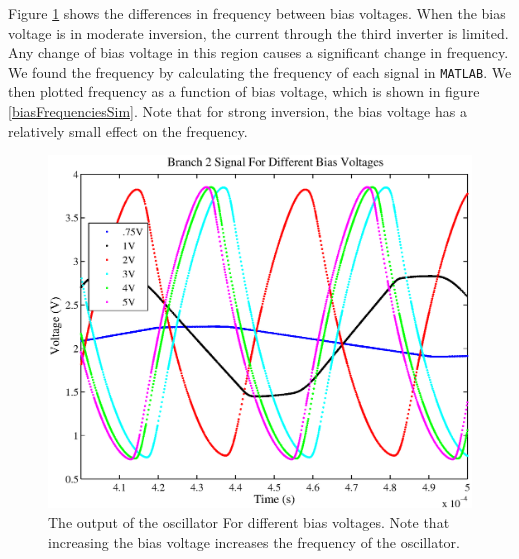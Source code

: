 \documentclass{article}
\begin{document}
Figure \ref{branch2DiffBiasSim} shows the differences in frequency between bias voltages. When the bias voltage is in moderate inversion, the current through the third inverter is limited. Any change of bias voltage in this region causes a significant change in frequency. We found the frequency by calculating the frequency of each signal in \texttt{MATLAB}. We then plotted frequency as a function of bias voltage, which is shown in figure \ref{biasFrequenciesSim}. Note that for strong inversion, the bias voltage has a relatively small effect on the frequency.

\begin{figure}[H]
\centering
\includegraphics[scale=.7]{branch2DiffBiasSim.eps}
\caption{The output of the oscillator For different bias voltages. Note that increasing the bias voltage increases the frequency of the oscillator.}
\label{branch2DiffBiasSim}
\end{figure}
\end{document}
